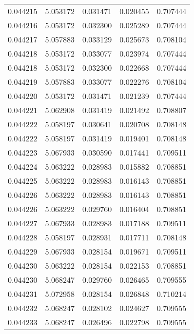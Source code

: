 \begin{tabular}{lrrrr}
0.044215    &  5.053172 &  0.031471 &  0.020455 &             0.707444 \\
0.044216    &  5.053172 &  0.032300 &  0.025289 &             0.707444 \\
0.044217    &  5.057883 &  0.033129 &  0.025673 &             0.708104 \\
0.044218    &  5.053172 &  0.033077 &  0.023974 &             0.707444 \\
0.044218    &  5.053172 &  0.032300 &  0.022668 &             0.707444 \\
0.044219    &  5.057883 &  0.033077 &  0.022276 &             0.708104 \\
0.044220    &  5.053172 &  0.031471 &  0.021239 &             0.707444 \\
0.044221    &  5.062908 &  0.031419 &  0.021492 &             0.708807 \\
0.044222    &  5.058197 &  0.030641 &  0.020708 &             0.708148 \\
0.044222    &  5.058197 &  0.031419 &  0.019401 &             0.708148 \\
0.044223    &  5.067933 &  0.030590 &  0.017441 &             0.709511 \\
0.044224    &  5.063222 &  0.028983 &  0.015882 &             0.708851 \\
0.044225    &  5.063222 &  0.028983 &  0.016143 &             0.708851 \\
0.044226    &  5.063222 &  0.028983 &  0.016143 &             0.708851 \\
0.044226    &  5.063222 &  0.029760 &  0.016404 &             0.708851 \\
0.044227    &  5.067933 &  0.028983 &  0.017188 &             0.709511 \\
0.044228    &  5.058197 &  0.028931 &  0.017711 &             0.708148 \\
0.044229    &  5.067933 &  0.028154 &  0.019671 &             0.709511 \\
0.044230    &  5.063222 &  0.028154 &  0.022153 &             0.708851 \\
0.044230    &  5.068247 &  0.029760 &  0.026465 &             0.709555 \\
0.044231    &  5.072958 &  0.028154 &  0.026848 &             0.710214 \\
0.044232    &  5.068247 &  0.028102 &  0.024627 &             0.709555 \\
0.044233    &  5.068247 &  0.026496 &  0.022798 &             0.709555 \\

\end{tabular}
